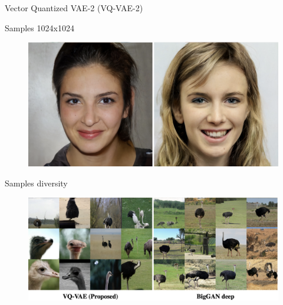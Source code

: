 \begin{frame}{Vector Quantized VAE-2  (VQ-VAE-2)}
	\begin{block}{Samples 1024x1024}
		\vspace{-0.2cm}
		\begin{figure}
			\centering
			\includegraphics[width=0.63\linewidth]{figs/vqvae2_faces}
		\end{figure}
	\end{block}
	\vspace{-0.6cm}
	\begin{block}{Samples diversity}
		\vspace{-0.2cm}
		\begin{figure}
			\centering
			\includegraphics[width=0.65\linewidth]{figs/vqvae2_diversity}
		\end{figure}
	\end{block}
\end{frame}
